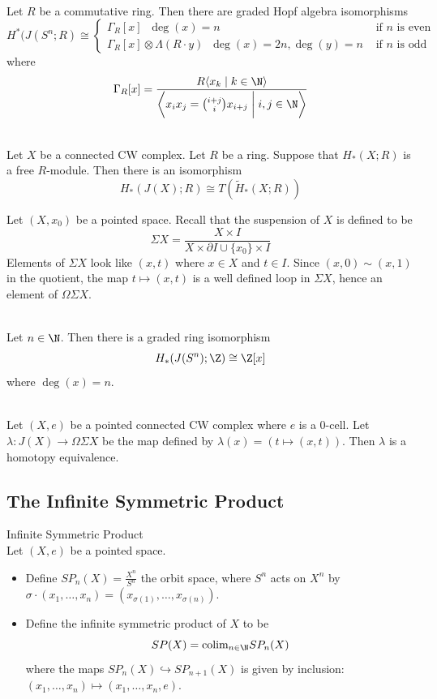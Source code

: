 \documentclass[a4paper]{article}
\begin{document}
\begin{eg}{}{}\\
Let $R$ be a commutative ring. Then there are graded Hopf algebra isomorphisms $$H^\ast(J(S^n;R)\cong\begin{cases}
\Gamma_R[x]\;\;\deg(x)=n & \text{ if }n\text{ is even }\\
\Gamma_R[x]\otimes\Lambda(R\cdot y)\;\;\deg(x)=2n,\deg(y)=n & \text{ if }n\text{ is odd }
\end{cases}$$ where $$\Gamma_R[x]=
\frac{R\langle x_k\;|\;k\in\N\rangle}{\left\langle x_ix_j=\binom{i+j}{i}x_{i+j}\;\bigg{|}\;i,j\in\N\right\rangle}$$
\end{eg}

\begin{prp}{}{}\\
Let $X$ be a connected CW complex. Let $R$ be a ring. Suppose that $H_\ast(X;R)$ is a free $R$-module. Then there is an isomorphism $$H_\ast(J(X);R)\cong T(\widetilde{H}_\ast(X;R))$$
\end{prp}

Let $(X,x_0)$ be a pointed space. Recall that the suspension of $X$ is defined to be $$\Sigma X=\frac{X\times I}{X\times\partial I\cup\{x_0\}\times I}$$ Elements of $\Sigma X$ look like $(x,t)$ where $x\in X$ and $t\in I$. Since $(x,0)\sim(x,1)$ in the quotient, the map $t\mapsto(x,t)$ is a well defined loop in $\Sigma X$, hence an element of $\Omega\Sigma X$. 

\begin{eg}{}{}\\
Let $n\in\N$. Then there is a graded ring isomorphism $$H_\ast(J(S^n);\Z)\cong\Z[x]$$ where $\deg(x)=n$. 
\end{eg}

\begin{prp}{}{}\\
Let $(X,e)$ be a pointed connected CW complex where $e$ is a $0$-cell. Let $\lambda:J(X)\to\Omega\Sigma X$ be the map defined by $\lambda(x)=(t\mapsto(x,t))$. Then $\lambda$ is a homotopy equivalence. 
\end{prp}

\subsection{The Infinite Symmetric Product}
\begin{defn}{Infinite Symmetric Product}{}\\
Let $(X,e)$ be a pointed space. 
\begin{itemize}
\item Define $SP_n(X)=\frac{X^n}{S^n}$ the orbit space, where $S^n$ acts on $X^n$ by $\sigma\cdot(x_1,\dots,x_n)=(x_{\sigma(1)},\dots,x_{\sigma(n)})$. 
\item Define the infinite symmetric product of $X$ to be $$SP(X)=\text{colim}_{n\in\N}SP_n(X)$$ where the maps $SP_n(X)\hookrightarrow SP_{n+1}(X)$ is given by inclusion: $(x_1,\dots,x_n)\mapsto(x_1,\dots,x_n,e)$. 
\end{itemize}
\end{defn}
\end{document}

